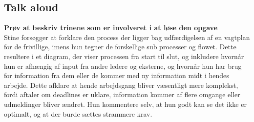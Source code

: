 \subsection{Talk aloud}
\label{i4q13}
\noindent \textbf{Prøv at beskriv trinene som er involveret i at løse den opgave} \\
Stine forsøgger at forklare den process der ligger bag udfærdigelsen af en vagtplan for de frivillige, imens hun tegner de forskellige sub processer og flowet. Dette resultere i et diagram, der viser processen fra start til slut, og inkludere hvornår hun er afhængig af input fra andre ledere og eksterne, og hvornår hun har brug for information fra dem eller de kommer med ny information midt i hendes arbejde. Dette afklare at hende arbejdsgang bliver væsentligt mere komplekst, fordi aftaler om deadlines er uklare, information kommer af flere omgange eller udmeldinger bliver ændret. Hun kommentere selv, at hun godt kan se det ikke er optimalt, og at der burde sættes strammere krav.
